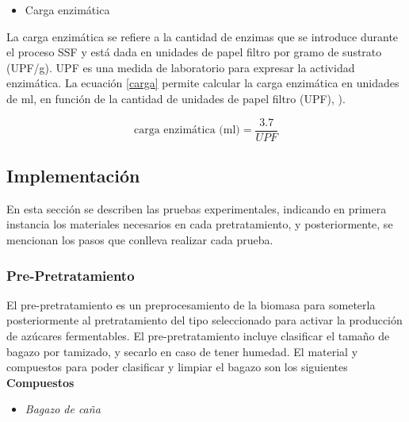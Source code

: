 \documentclass[12pt]{article}
\begin{document}
		
			\begin{itemize}
			\item  Carga enzimática
	     	\end{itemize}
		
		
	La carga enzimática se refiere a  la cantidad de enzimas que se introduce durante el proceso SSF y está dada en unidades de papel filtro por gramo de sustrato (UPF/g). UPF es una medida de laboratorio para expresar la actividad enzimática. La ecuación \ref{carga} permite calcular la carga enzimática en unidades de ml, en función de la cantidad de unidades de papel filtro (UPF),  \cite{Arturo2022evaluacion}).
			
	\begin{equation}
		\label{carga}
		\text{carga enzimática (ml)} = \frac{3.7}{UPF}
	\end{equation}
	

	
		

			
			
	
			\subsection{Implementación}

			En esta sección se describen las pruebas experimentales, indicando en primera instancia los materiales necesarios en cada pretratamiento, y posteriormente, se mencionan los pasos que conlleva realizar cada prueba.
			

			\subsubsection{Pre-Pretratamiento}

			
			El pre-pretratamiento es un preprocesamiento de la biomasa para someterla posteriormente al pretratamiento del tipo seleccionado para activar la producción de azúcares fermentables. El pre-pretratamiento incluye clasificar el tamaño de bagazo por tamizado, y secarlo en caso de tener humedad. El material y compuestos para poder clasificar y limpiar el bagazo son los siguientes
			\\[0.5em]
			\textbf{Compuestos} 
			\begin{itemize}[label=\textcolor{blue}{$\bullet$}]
			 \item	\textit{ Bagazo de caña }
			\end{itemize} 
			
\end{document}
